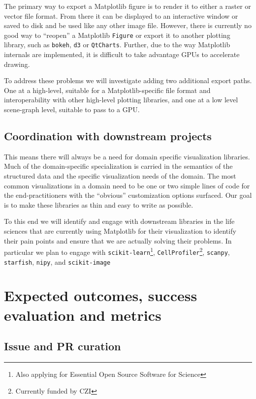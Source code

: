 \documentclass[11pt]{article}  %
\begin{document}
The primary way to export a Matplotlib figure is to render it to
either a raster or vector file format.  From there it can be displayed
to an interactive window or saved to disk and be used like any other
image file.  However, there is currently no good way to ``reopen'' a
Matplotlib \texttt{Figure} or export it to another plotting library,
such as \texttt{bokeh}, \texttt{d3} or \texttt{QtCharts}.
Further, due to the way Matplotlib internals are implemented, it
is difficult to take advantage GPUs to accelerate drawing.

To address these problems we will investigate adding two additional
export paths.  One at a high-level, suitable for a Matplotlib-specific
file format and interoperability with other high-level plotting
libraries, and one at a low level scene-graph level, suitable to pass
to a GPU.


\subsection{Coordination with downstream projects}

This means there will
always be a need for domain specific visualization libraries.
Much of the domain-specific specialization is carried in the semantics
of the structured data and the specific visualization needs of the
domain.
The most common visualizations in a domain need to be one or
two simple lines of code for the end-practitioners with the ``obvious''
customization options surfaced.  Our goal is to make these
libraries as thin and easy to write as possible.


To this end we will identify and engage with downstream libraries in
the life sciences that are currently using Matplotlib for their
visualization to identify their pain points and ensure that we are
actually solving their problems.  In particular we plan to engage with
\texttt{scikit-learn}\footnote{Also applying for Essential Open Source
Software for Science}, \texttt{CellProfiler}\footnote{Currently funded
by CZI\label{f:czi}}, \texttt{scanpy},
\texttt{starfish}, \texttt{nipy}, and
\texttt{scikit-image}


\section{Expected outcomes, success evaluation and metrics}
\subsection{Issue and PR curation}
\end{document}
